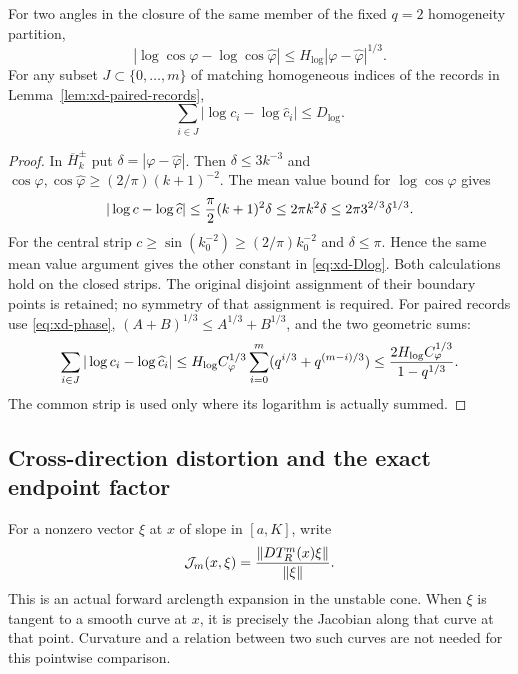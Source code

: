\begin{lemma}
\label{lem:xd-log-incidence}
For two angles in the closure of the same member of the fixed $q=2$
homogeneity partition,
\begin{equation}\label{eq:xd-log-incidence}
 |\log\cos\varphi-\log\cos\widehat\varphi|
                \le H_{\log}|\varphi-\widehat\varphi|^{1/3}.
\end{equation}
For any subset $J\subset\{0,\ldots,m\}$ of matching homogeneous
indices of the records in Lemma~\ref{lem:xd-paired-records},
\begin{equation}\label{eq:xd-log-sum}
 \sum_{i\in J}|\log c_i-\log\widehat c_i|\le D_{\log}.
\end{equation}
\end{lemma}

\begin{proof}
In $\overline H_k^\pm$ put $\delta=|\varphi-\widehat\varphi|$.
Then $\delta\le3k^{-3}$ and
$\cos\varphi,\cos\widehat\varphi\ge(2/\pi)(k+1)^{-2}$.
The mean value bound for $\log\cos\varphi$ gives
\[
 |\log c-\log\widehat c|
 \le{\pi\over2}(k+1)^2\delta
 \le2\pi k^2\delta
 \le2\pi3^{2/3}\delta^{1/3}.
\]
For the central strip $c\ge\sin(k_0^{-2})\ge(2/\pi)k_0^{-2}$
and $\delta\le\pi$.  Hence the same mean value argument gives the
other constant in \eqref{eq:xd-Dlog}.  Both calculations hold on the
closed strips.  The original disjoint assignment of their boundary
points is retained; no symmetry of that assignment is required.
For paired records use \eqref{eq:xd-phase},
$(A+B)^{1/3}\le A^{1/3}+B^{1/3}$, and the two geometric sums:
\[
 \sum_{i\in J}|\log c_i-\log\widehat c_i|
 \le H_{\log}C_\varphi^{1/3}
        \sum_{i=0}^m(q^{i/3}+q^{(m-i)/3})
 \le {2H_{\log}C_\varphi^{1/3}\over1-q^{1/3}}.
\]
The common strip is used only where its logarithm is actually summed.
\end{proof}

\subsection{Cross-direction distortion and the exact endpoint factor}

For a nonzero vector $\xi$ at $x$ of slope in $[a,K]$, write
\[
 \mathcal J_m(x,\xi)={\|D T_R^m(x)\xi\|\over\|\xi\|}.
\]
This is an actual forward arclength expansion in the unstable cone.
When $\xi$ is tangent to a smooth curve at $x$, it is precisely the
Jacobian along that curve at that point.  Curvature and a relation
between two such curves are not needed for this pointwise comparison.

